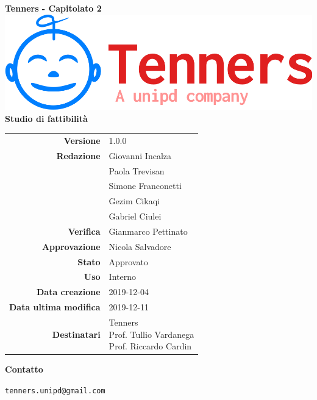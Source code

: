 \begin{titlepage}
	\begin{center}
		\large \textbf{Tenners - Capitolato 2}
		\vfill
		\includegraphics[scale = 0.3]{./res/img/logo.png}\\
		\vfill
		\Huge \textbf{Studio di fattibilità}

        \vfill
        \large

        \begin{tabular}{r|l}
                        \textbf{Versione} & 1.0.0 \\
                        \textbf{Redazione} &
                        Giovanni Incalza \\&
                        Paola Trevisan \\&
	                    Simone Franconetti\\&
	                    Gezim Cikaqi\\&
                        Gabriel Ciulei \\
                        \textbf{Verifica} & 
                        Gianmarco Pettinato \\
                        \textbf{Approvazione} & Nicola Salvadore \\
                        \textbf{Stato} & Approvato \\
                        \textbf{Uso} &  Interno\\
                        \textbf{Data creazione} &  2019-12-04\\
                        \textbf{Data ultima modifica} & 2019-12-11 \\
                        \textbf{Destinatari} & \parbox[t]{5cm}{Tenners\\Prof. Tullio Vardanega\\Prof. Riccardo Cardin}
                \end{tabular}
                \vfill
                \normalsize
                \vfill
                \textbf{Contatto}
                
                \texttt{tenners.unipd@gmail.com}

	\end{center}
\end{titlepage}